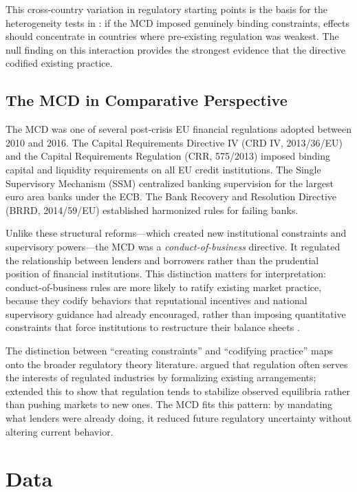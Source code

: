 \documentclass[12pt]{article}
\begin{document}
This cross-country variation in regulatory starting points is the basis for the heterogeneity tests in : if the MCD imposed genuinely binding constraints, effects should concentrate in countries where pre-existing regulation was weakest. The null finding on this interaction provides the strongest evidence that the directive codified existing practice.

\subsection{The MCD in Comparative Perspective}

The MCD was one of several post-crisis EU financial regulations adopted between 2010 and 2016. The Capital Requirements Directive IV (CRD IV, 2013/36/EU) and the Capital Requirements Regulation (CRR, 575/2013) imposed binding capital and liquidity requirements on all EU credit institutions. The Single Supervisory Mechanism (SSM) centralized banking supervision for the largest euro area banks under the ECB. The Bank Recovery and Resolution Directive (BRRD, 2014/59/EU) established harmonized rules for failing banks.

Unlike these structural reforms---which created new institutional constraints and supervisory powers---the MCD was a \textit{conduct-of-business} directive. It regulated the relationship between lenders and borrowers rather than the prudential position of financial institutions. This distinction matters for interpretation: conduct-of-business rules are more likely to ratify existing market practice, because they codify behaviors that reputational incentives and national supervisory guidance had already encouraged, rather than imposing quantitative constraints that force institutions to restructure their balance sheets \citep{enriques_2015_eu_finance}.

The distinction between ``creating constraints'' and ``codifying practice'' maps onto the broader regulatory theory literature. \citet{stigler_1971_regulation} argued that regulation often serves the interests of regulated industries by formalizing existing arrangements; \citet{peltzman_1976_regulation} extended this to show that regulation tends to stabilize observed equilibria rather than pushing markets to new ones. The MCD fits this pattern: by mandating what lenders were already doing, it reduced future regulatory uncertainty without altering current behavior.


\section{Data}
\label{sec:data}
\end{document}
